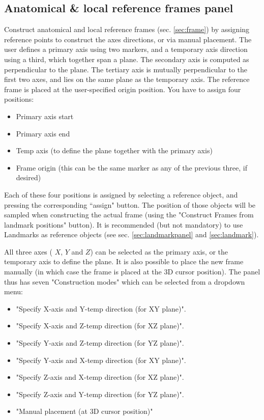 \documentclass{article}
\begin{document}
\FloatBarrier %

\subsection{Anatomical \& local reference frames panel}
\label{sec:framepanel}

Construct anatomical and local reference frames (sec. \ref{sec:frame}) by assigning reference points to construct the axes directions, or via manual placement. The user defines a primary axis using two markers, and a temporary axis direction using a third, which together span a plane. The secondary axis is computed as perpendicular to the plane. The tertiary axis is mutually perpendicular to the first two axes, and lies on the same plane as the temporary axis. The reference frame is placed at the user-specified origin position.
You have to assign four positions:

\begin{itemize}
\item Primary axis start
\item Primary axis end
\item Temp axis (to define the plane together with the primary axis)
\item Frame origin (this can be the same marker as any of the previous three, if desired)
\end{itemize}

Each of these four positions is assigned by selecting a reference object, and pressing the corresponding ``assign" button. The position of those objects will be sampled when constructing the actual frame (using the "Construct Frames from landmark positions" button). It is recommended (but not mandatory) to use Landmarks as reference objects (see sec. \ref{sec:landmarkpanel} and \ref{sec:landmark}).

All three axes ( \(X\), \(Y\) and \(Z\)) can be selected as the primary axis, or the temporary axis to define the plane. It is also possible to place the new frame manually (in which case the frame is placed at the 3D cursor position). The panel thus has seven "Construction modes" which can be selected from a dropdown menu:

\begin{itemize}
    \item "Specify X-axis and Y-temp direction (for XY plane)".  
    \item "Specify X-axis and Z-temp direction (for XZ plane)".
    \item "Specify Y-axis and Z-temp direction (for YZ plane)".
    \item "Specify Y-axis and X-temp direction (for XY plane)".
    \item "Specify Z-axis and X-temp direction (for XZ plane)".
    \item "Specify Z-axis and Y-temp direction (for YZ plane)".
    \item "Manual placement (at 3D cursor position)"
\end{itemize}
\end{document}
